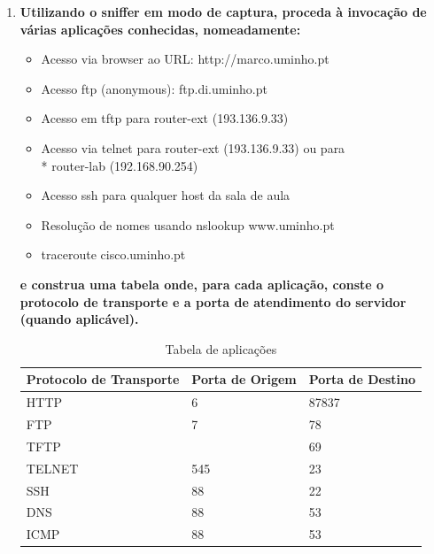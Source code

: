 \documentclass{llncs}
\begin{document}
  \begin{enumerate}[\textbf{b)}]
    \item \textbf{Utilizando o sniffer em modo de captura, proceda à invocação de várias aplicações conhecidas, nomeadamente:}
    \vspace{5mm}
    \begin{itemize}
        \item Acesso via browser ao URL: http://marco.uminho.pt
        \item Acesso ftp (anonymous): ftp.di.uminho.pt
        \item Acesso em tftp para router-ext (193.136.9.33)
        \item Acesso via telnet para router-ext (193.136.9.33) ou para\\*
        router-lab (192.168.90.254)
        \item Acesso ssh para qualquer host da sala de aula
        \item Resolução de nomes usando nslookup www.uminho.pt
        \item traceroute cisco.uminho.pt
    \end{itemize}
    \par \textbf{e construa uma tabela onde, para cada aplicação, conste o protocolo de transporte e a porta de atendimento do
    servidor (quando aplicável).}
    
    \vspace{5mm}
    
    \begin{table}[h!]
      \centering
      \begin{tabular}{p{4.4cm}  p{3cm}  p{3cm}} 
      \hline
      \textbf{Protocolo de Transporte} & \textbf{Porta de Origem} & \textbf{Porta de Destino}\\ [1ex] 
      \hline\hline
      HTTP & 6 & 87837 \\ [1ex]
      FTP & 7 & 78 \\ [1ex]
      TFTP &  & 69 \\ [1ex]
      TELNET & 545 & 23 \\ [1ex]
      SSH & 88 & 22 \\ [1ex]
      DNS & 88 & 53 \\ [1ex]
      ICMP & 88 & 53 \\ [1ex] 
      \hline
      \end{tabular}
      \caption{Tabela de aplicações}
      \label{table:1}
      \end{table}


  \end{enumerate}
\end{document}

